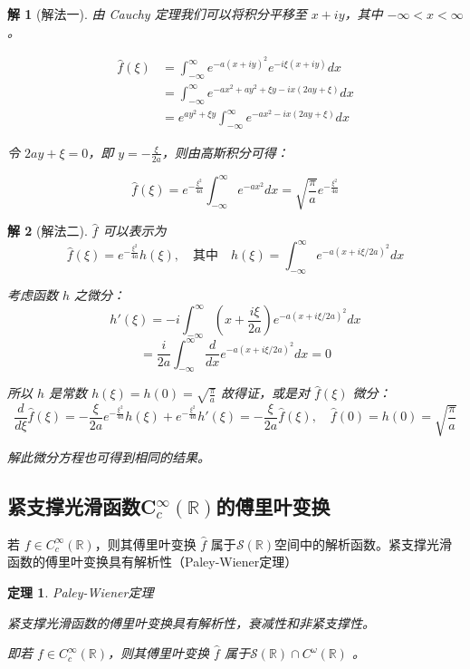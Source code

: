\documentclass[12pt,a4paper]{article}
\theoremstyle{plain}
\newtheorem{theorem}{定理}[section]
\newtheorem{solution}{解}
\theoremstyle{definition}
\theoremstyle{remark}
\begin{document}
\begin{solution}[解法一]
	由 Cauchy 定理我们可以将积分平移至 \( x + iy \)，其中 \( -\infty < x < \infty \)。
	
	\[
	\begin{aligned}
		\widehat{f}(\xi) &= \int_{-\infty}^{\infty} e^{-a(x+iy)^2} e^{-i\xi(x+iy)} dx \\
		&= \int_{-\infty}^{\infty} e^{-ax^2 + ay^2 + \xi y - ix(2ay + \xi)} dx \\
		&= e^{ay^2 + \xi y} \int_{-\infty}^{\infty} e^{-ax^2 - ix(2ay + \xi)} dx
	\end{aligned}
	\]
	
	令 \( 2ay + \xi = 0 \)，即 \( y = -\frac{\xi}{2a} \)，则由高斯积分可得：
	
	\[
	\widehat{f}(\xi) = e^{-\frac{\xi^2}{4a}} \int_{-\infty}^{\infty} e^{-ax^2} dx = \sqrt{\frac{\pi}{a}} e^{-\frac{\xi^2}{4a}}
	\]
	
\end{solution}

\begin{solution}[解法二]
	$\widehat{f}$ 可以表示为
	\[
	\widehat{f}(\xi) = e^{-\frac{\xi^2}{4a}} h(\xi), \quad \text{其中} \quad h(\xi) = \int_{-\infty}^{\infty} e^{-a(x + i\xi/2a)^2} dx
	\]
	
	考虑函数 $h$ 之微分：
	\[
	h'(\xi) = -i \int_{-\infty}^{\infty} \left(x + \frac{i\xi}{2a}\right) e^{-a(x + i\xi/2a)^2} dx
	\]
	\[
	= \frac{i}{2a} \int_{-\infty}^{\infty} \frac{d}{dx} e^{-a(x + i\xi/2a)^2} dx = 0
	\]
	
	所以 $h$ 是常数 $h(\xi) = h(0) = \sqrt{\frac{\pi}{a}}$ 故得证，或是对 $\widehat{f}(\xi)$ 微分：
	\[
	\frac{d}{d\xi} \widehat{f}(\xi) = -\frac{\xi}{2a} e^{-\frac{\xi^2}{4a}} h(\xi) + e^{-\frac{\xi^2}{4a}} h'(\xi) = -\frac{\xi}{2a} \widehat{f}(\xi), \quad \widehat{f}(0) = h(0) = \sqrt{\frac{\pi}{a}}
	\]
	
	解此微分方程也可得到相同的结果。
\end{solution}



\subsection{紧支撑光滑函数C$_c^\infty(\mathbb{R})$的傅里叶变换}
若 $f \in C_c^\infty(\mathbb{R})$，则其傅里叶变换 $\hat{f}$ 属于$\mathcal{S}(\mathbb{R})$空间中的解析函数。紧支撑光滑函数的傅里叶变换具有解析性（Paley-Wiener定理）
\begin{theorem}Paley-Wiener定理
	
	紧支撑光滑函数的傅里叶变换具有解析性，衰减性和非紧支撑性。
	
	即若 $f \in C_c^\infty(\mathbb{R})$，则其傅里叶变换 $\hat{f}$ 属于$\mathcal{S}(\mathbb{R})\cap C^\omega(\mathbb{R})$ 。
	
\end{theorem}
\end{document}
